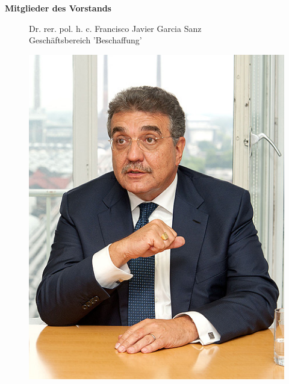 \documentclass[12pt]{article}
\begin{document}
\textbf{Mitglieder des Vorstands}
\begin{figure}[here!]
	\centering
	\begin{minipage}[h]{0.65\textwidth}
		Dr. rer. pol. h. c. Francisco Javier Garcia Sanz\\
		Geschäftsbereich 'Beschaffung'
	\end{minipage}
		\begin{minipage}[h]{0.10\textwidth}
		\hspace{1cm}
		\cite{fspic}
	\end{minipage}
	\begin{minipage}[h]{0.20\textwidth}
		\centering
		\includegraphics[width=1.0\textwidth]{images/FranciscoSanz.jpg}
		\label{fig:vorstandvw1}
	\end{minipage}
\end{figure}
\end{document}
